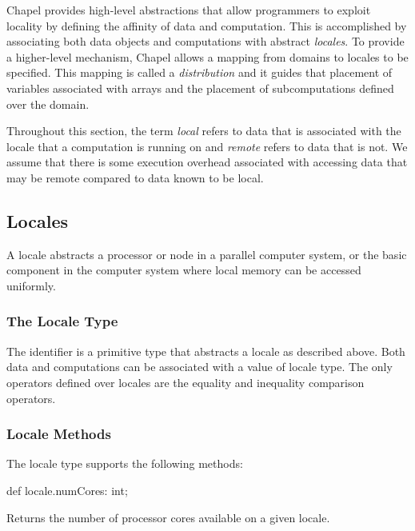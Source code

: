 \label{Locality_and_Distribution}

Chapel provides high-level abstractions that allow programmers to
exploit locality by defining the affinity of data and computation.
This is accomplished by associating both data objects and computations
with abstract {\em locales}. To provide a higher-level mechanism,
Chapel allows a mapping from domains to locales to be specified. This
mapping is called a {\em distribution} and it guides that placement of
variables associated with arrays and the placement of subcomputations
defined over the domain.

Throughout this section, the term {\em local} refers to data that is
associated with the locale that a computation is running on and {\em
remote} refers to data that is not. We assume that there is some
execution overhead associated with accessing data that may be remote
compared to data known to be local.

\subsection{Locales}
\label{Locales}

A locale abstracts a processor or node in a parallel computer system,
or the basic component in the computer system where local memory can
be accessed uniformly.

\subsubsection{The Locale Type}
\label{The_Locale_Type}

The identifier  is a primitive type that abstracts a
locale as described above.  Both data and computations can be
associated with a value of locale type. The only operators defined
over locales are the equality and inequality comparison operators.

\subsubsection{Locale Methods}
\label{Locale_Methods}

The locale type supports the following methods:

\begin{protohead}
def locale.numCores: int;
\end{protohead}
\begin{protobody}
Returns the number of processor cores available on a given locale.
\end{protobody}

